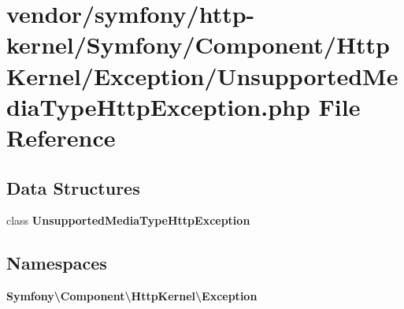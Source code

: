 \section{vendor/symfony/http-\/kernel/\+Symfony/\+Component/\+Http\+Kernel/\+Exception/\+Unsupported\+Media\+Type\+Http\+Exception.php File Reference}
\label{_unsupported_media_type_http_exception_8php}
\subsection*{Data Structures}
\begin{DoxyCompactItemize}
\item 
class {\bf Unsupported\+Media\+Type\+Http\+Exception}
\end{DoxyCompactItemize}
\subsection*{Namespaces}
\begin{DoxyCompactItemize}
\item 
 {\bf Symfony\textbackslash{}\+Component\textbackslash{}\+Http\+Kernel\textbackslash{}\+Exception}
\end{DoxyCompactItemize}
